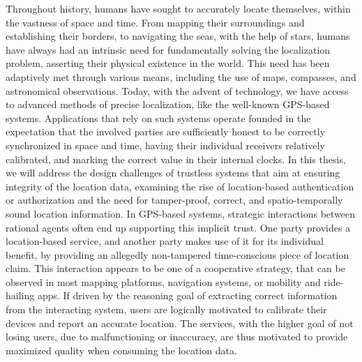 

Throughout history, humans have sought to accurately locate themselves, within the vastness of space and time. From mapping their surroundings and establishing their borders, to navigating the seas, with the help of stars, humans have always had an intrinsic need for fundamentally solving the localization problem, asserting their physical existence in the world. This need has been adaptively met through various means, including the use of maps, compasses, and astronomical observations. Today, with the advent of technology, we have access to advanced methods of precise localization, like the well-known GPS-based systems. Applications that rely on such systems operate founded in the expectation that the involved parties are sufficiently honest to be correctly synchronized in space and time, having their individual receivers relatively calibrated, and marking the correct value in their internal clocks. In this thesis, we will address the design challenges of trustless systems that aim at ensuring integrity of the location data, examining the rise of location-based authentication or authorization and the need for tamper-proof, correct, and spatio-temporally sound location information. In GPS-based systems, strategic interactions between rational agents often end up supporting this implicit trust. One party provides a location-based service, and another party makes use of it for its individual benefit, by providing an allegedly non-tampered time-conscious piece of location claim. This interaction appears to be one of a cooperative strategy, that can be observed in most mapping platforms, navigation systems, or mobility and ride-hailing apps. If driven by the reasoning goal of extracting correct information from the interacting system, users are logically motivated to calibrate their devices and report an accurate location. The services, with the higher goal of not losing users, due to malfunctioning or inaccuracy, are thus motivated to provide maximized quality when consuming the location data. 

